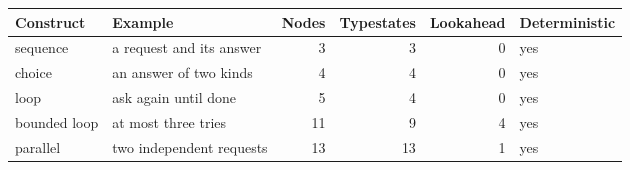 \begin{tabular}{@{}llrrrl@{}}
\toprule
Construct & Example & Nodes & Typestates & Lookahead & Deterministic \\
\midrule
sequence & a request and its answer & 3 & 3 & 0 & yes \\
choice & an answer of two kinds & 4 & 4 & 0 & yes \\
loop & ask again until done & 5 & 4 & 0 & yes \\
bounded loop & at most three tries & 11 & 9 & 4 & yes \\
parallel & two independent requests & 13 & 13 & 1 & yes \\
\bottomrule
\end{tabular}
